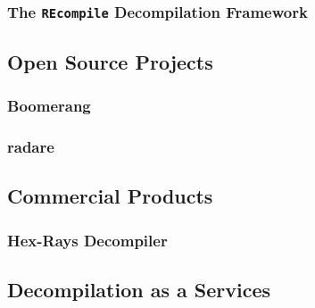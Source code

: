 \documentclass[12pt, a4paper]{article}
\begin{document}
\cite{readable_decomp}

\subsubsection{The \texttt{REcompile} Decompilation Framework}

\cite{recompile}


\subsection{Open Source Projects}


\subsubsection{Boomerang}

\cite{boomerang}


\subsubsection{radare}

\cite{radare}


\subsection{Commercial Products}



\subsubsection{Hex-Rays Decompiler}

\cite{hexrays}


\subsection{Decompilation as a Services}
\end{document}
